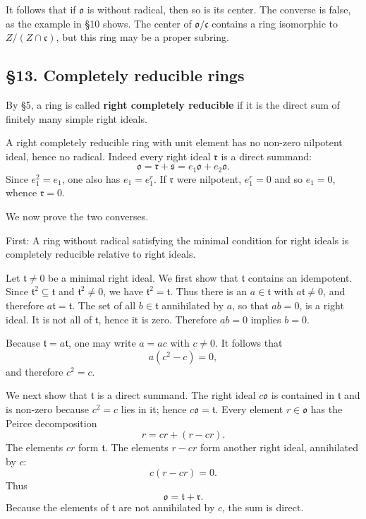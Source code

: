 \documentclass[11pt]{article}
\begin{document}
It follows that if \(\mathfrak{o}\) is without radical, then so is its
center. The converse is false, as the example in §10 shows. The center
of \(\mathfrak{o}/\mathfrak c\) contains a ring isomorphic to
\(Z/(Z\cap\mathfrak c)\), but this ring may be a proper subring.

\subsection{§13. Completely reducible
rings}\label{completely-reducible-rings}

By §5, a ring is called \textbf{right completely reducible} if it is the
direct sum of finitely many simple right ideals.

A right completely reducible ring with unit element has no non-zero
nilpotent ideal, hence no radical. Indeed every right ideal
\(\mathfrak r\) is a direct summand: \[
  \mathfrak{o}=\mathfrak r+\mathfrak s=e_1\mathfrak{o}+e_2\mathfrak{o}.
\] Since \(e_1^2=e_1\), one also has \(e_1=e_1^r\). If \(\mathfrak r\)
were nilpotent, \(e_1^r=0\) and so \(e_1=0\), whence \(\mathfrak r=0\).

We now prove the two converses.

First: A ring without radical satisfying the minimal condition for right
ideals is completely reducible relative to right ideals.

Let \(\mathfrak t\ne0\) be a minimal right ideal. We first show that
\(\mathfrak t\) contains an idempotent. Since
\(\mathfrak t^2\subseteq\mathfrak t\) and \(\mathfrak t^2\ne0\), we have
\(\mathfrak t^2=\mathfrak t\). Thus there is an \(a\in\mathfrak t\) with
\(a\mathfrak t\ne0\), and therefore \(a\mathfrak t=\mathfrak t\). The
set of all \(b\in\mathfrak t\) annihilated by \(a\), so that \(ab=0\),
is a right ideal. It is not all of \(\mathfrak t\), hence it is zero.
Therefore \(ab=0\) implies \(b=0\).

Because \(\mathfrak t=a\mathfrak t\), one may write \(a=ac\) with
\(c\ne0\). It follows that \[
  a(c^2-c)=0,
\] and therefore \(c^2=c\).

We next show that \(\mathfrak t\) is a direct summand. The right ideal
\(c\mathfrak{o}\) is contained in \(\mathfrak t\) and is non-zero
because \(c^2=c\) lies in it; hence \(c\mathfrak{o}=\mathfrak t\). Every
element \(r\in\mathfrak{o}\) has the Peirce decomposition \[
  r=cr+(r-cr).
\] The elements \(cr\) form \(\mathfrak t\). The elements \(r-cr\) form
another right ideal, annihilated by \(c\): \[
  c(r-cr)=0.
\] Thus \[
  \mathfrak{o}=\mathfrak t+\mathfrak r.
\] Because the elements of \(\mathfrak t\) are not annihilated by \(c\),
the sum is direct.
\end{document}
